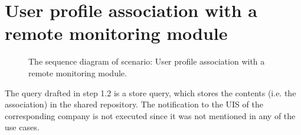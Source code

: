 \section{User profile association with a remote monitoring module}

\begin{figure}
	\begin{centering}
		\caption{The sequence diagram of scenario: User profile association with a
		remote monitoring module.}
		\label{fig:scenario-5-2}
	\end{centering}
\end{figure}

\npar The query drafted in step 1.2 is a store query, which stores the contents
(i.e. the association) in the shared repository. The notification to the UIS of
the corresponding company is not executed since it was not mentioned in any of
the use cases.
